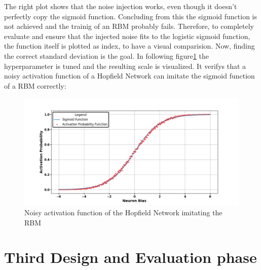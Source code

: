 The right plot shows that the noise injection works, even though it doesn't perfectly copy the sigmoid function.
Concluding from this the sigmoid function is not achieved and the trainig of an \ac{RBM} probably fails. 
Therefore, to completely evaluate and ensure that the injected noise fits to the logistic sigmoid function, the function itself is plotted 
as index, to have a visual comparision. 
Now, finding the correct standard deviation is the goal. 
In following figure\ref{Noisy_acitivation_function_good} the hyperparameter is tuned and the resulting scale is visualized.
It verifys that a noisy activation function of a Hopfield Network can imitate the sigmoid function of a \ac{RBM} correctly:
\begin{figure}[H]
    \centering
    \includegraphics[width=1\linewidth]{graphics/Noisy_HNN_2.png}
    \caption{Noisy activation function of the Hopfield Network imitating the \ac{RBM}}
    \label{Noisy_acitivation_function_good}
\end{figure}
\section{Third Design and Evaluation phase}

